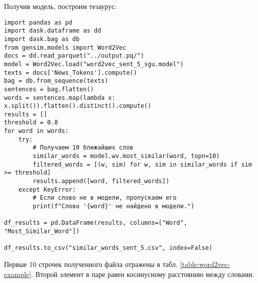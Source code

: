 \documentclass[coursework]{SCWorks}
\begin{document}
Получив модель, построим тезаурус:
\begin{verbatim}
import pandas as pd
import dask.dataframe as dd
import dask.bag as db
from gensim.models import Word2Vec
docs = dd.read_parquet("../output.pq/")
model = Word2Vec.load("word2vec_sent_5_sgu.model")
texts = docs['News_Tokens'].compute()
bag = db.from_sequence(texts)
sentences = bag.flatten()
words = sentences.map(lambda x: x.split()).flatten().distinct().compute()
results = []
threshold = 0.8
for word in words:
    try:
        # Получаем 10 ближайших слов
        similar_words = model.wv.most_similar(word, topn=10)
        filtered_words = [(w, sim) for w, sim in similar_words if sim >= threshold]
        results.append([word, filtered_words])
    except KeyError:
        # Если слово не в модели, пропускаем его
        print(f"Слово '{word}' не найдено в модели.")

df_results = pd.DataFrame(results, columns=["Word", "Most_Similar_Word"])

df_results.to_csv("similar_words_sent_5.csv", index=False)
\end{verbatim}
Первые 10 строчек полученного файла отражены в табл. \ref{table:word2vec-example}. Второй элемент в паре равен косинусному расстоянию между словами.
\end{document}
